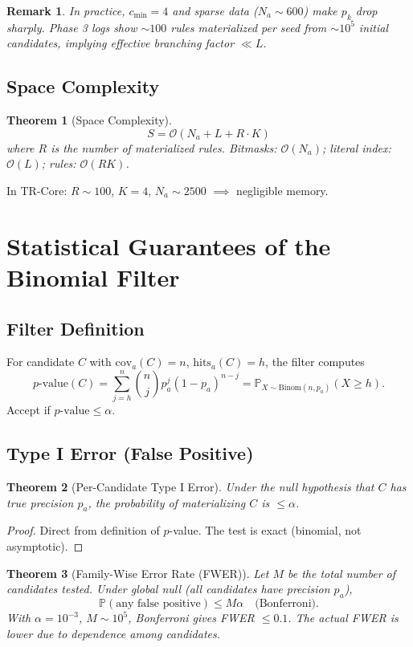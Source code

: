 \documentclass[11pt]{article}
\newcommand{\Prob}{\mathbb{P}}
\newcommand{\Binom}{\mathrm{Binom}}
\newcommand{\Oh}{\mathcal{O}}
\newtheorem{theorem}{Theorem}
\newtheorem{remark}{Remark}
\begin{document}
\begin{remark}
In practice, $c_{\min}=4$ and sparse data ($N_a \sim 600$) make $p_k$ drop sharply. Phase 3 logs show $\sim 100$ rules materialized per seed from $\sim 10^5$ initial candidates, implying effective branching factor $\ll L$.
\end{remark}

\subsection{Space Complexity}

\begin{theorem}[Space Complexity]
\[
S = \Oh(N_a + L + R \cdot K)
\]
where $R$ is the number of materialized rules. Bitmasks: $\Oh(N_a)$; literal index: $\Oh(L)$; rules: $\Oh(R K)$.
\end{theorem}
In TR-Core: $R \sim 100$, $K=4$, $N_a \sim 2500$ $\implies$ negligible memory.

\section{Statistical Guarantees of the Binomial Filter}

\subsection{Filter Definition}
For candidate $C$ with $\mathrm{cov}_a(C) = n$, $\mathrm{hits}_a(C) = h$, the filter computes
\[
p\text{-value}(C) = \sum_{j=h}^n \binom{n}{j} p_a^j (1-p_a)^{n-j} = \Prob_{X \sim \Binom(n, p_a)}(X \geq h).
\]
Accept if $p\text{-value} \leq \alpha$.

\subsection{Type I Error (False Positive)}

\begin{theorem}[Per-Candidate Type I Error]
Under the null hypothesis that $C$ has true precision $p_a$, the probability of materializing $C$ is $\leq \alpha$.
\end{theorem}
\begin{proof}
Direct from definition of $p$-value. The test is exact (binomial, not asymptotic).
\end{proof}

\begin{theorem}[Family-Wise Error Rate (FWER)]
Let $M$ be the total number of candidates tested. Under global null (all candidates have precision $p_a$),
\[
\Prob(\text{any false positive}) \leq M \alpha \quad \text{(Bonferroni)}.
\]
With $\alpha=10^{-3}$, $M \sim 10^5$, Bonferroni gives FWER $\leq 0.1$. The actual FWER is lower due to dependence among candidates.
\end{theorem}
\end{document}
